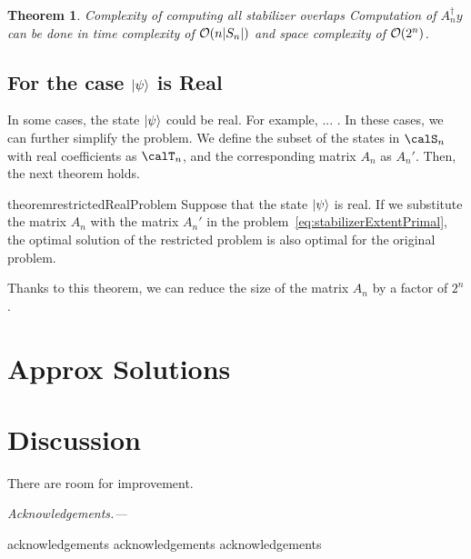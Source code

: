 \documentclass[a4paper, onecolumn, 11pt, longbibliography]{quantumarticle}
\newtheorem{theorem}{Theorem}
\begin{document}
\begin{theorem}{Complexity of computing all stabilizer overlaps}
    \label{thm:complexityStabilizerOverlap}
    Computation of $A_n^\dagger y$
    can be done in time complexity of
    $\order{n\abs{S_n}}$ and
    space complexity of $\order{2^n}$.
\end{theorem}

\subsection{For the case $\ket{\psi}$ is Real}
\label{sec:restrictedRealProblem}

In some cases, the state $\ket{\psi}$ could be real.
For example, ... .
In these cases, we can further simplify the problem.
We define the subset of the states in $\calS_n$ with real coefficients as $\calT_n$,
and the corresponding matrix $A_n$ as $A_n'$.
Then, the next theorem holds.
\begin{restatable}{theorem}{restrictedRealProblem}
    \label{thm:restrictedRealProblem}
    Suppose that the state $\ket{\psi}$ is real.
    If we substitute the matrix $A_n$
    with the matrix $A_n'$
    in the problem~\eqref{eq:stabilizerExtentPrimal},
    the optimal solution of the restricted problem
    is also optimal for the original problem.
\end{restatable}

Thanks to this theorem,
we can reduce the size of the matrix $A_n$
by a factor of $2^n$.

\section{Approx Solutions}

\section{Discussion}

There are room for improvement.

\emph{Acknowledgements.---}

acknowledgements acknowledgements acknowledgements




\appendix




\end{document}
